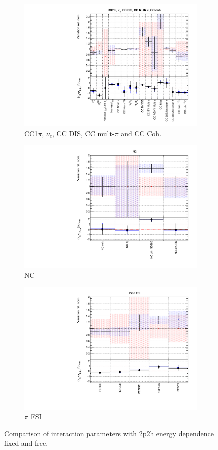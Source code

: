 \begin{figure}
\begin{subfigure}{0.49\textwidth}
  \centering
  \includegraphics[width=0.9\linewidth]{figs/fixed2p2hfitsxsec3}
  \caption{CC1$\pi$, $\nu_e$, CC DIS, CC mult-$\pi$ and CC Coh.}
\end{subfigure}
\begin{subfigure}{0.49\textwidth}
  \centering
  \includegraphics[width=0.9\linewidth]{figs/fixed2p2hfitsxsec4}
  \caption{NC}
\end{subfigure}
\begin{subfigure}{0.49\textwidth}
  \centering
  \includegraphics[width=0.9\linewidth]{figs/fixed2p2hfitsxsec5}
  \caption{$\pi$ FSI}
\end{subfigure}
\caption{Comparison of interaction parameters with 2p2h energy dependence fixed and free.}
\label{fig:fixed2p2hxsec}
\end{figure}

